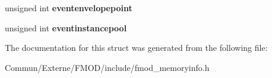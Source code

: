 \begin{DoxyCompactItemize}
\item 
unsigned int {\bfseries eventenvelopepoint}\hypertarget{struct_f_m_o_d___m_e_m_o_r_y___u_s_a_g_e___d_e_t_a_i_l_s_aeec51fe4108d9f383c5db076dcac34be}{}\label{struct_f_m_o_d___m_e_m_o_r_y___u_s_a_g_e___d_e_t_a_i_l_s_aeec51fe4108d9f383c5db076dcac34be}

\item 
unsigned int {\bfseries eventinstancepool}\hypertarget{struct_f_m_o_d___m_e_m_o_r_y___u_s_a_g_e___d_e_t_a_i_l_s_ac75baf7e2a3500aeab9a968276fa010c}{}\label{struct_f_m_o_d___m_e_m_o_r_y___u_s_a_g_e___d_e_t_a_i_l_s_ac75baf7e2a3500aeab9a968276fa010c}

\end{DoxyCompactItemize}


The documentation for this struct was generated from the following file\+:\begin{DoxyCompactItemize}
\item 
Commun/\+Externe/\+F\+M\+O\+D/include/fmod\+\_\+memoryinfo.\+h\end{DoxyCompactItemize}
